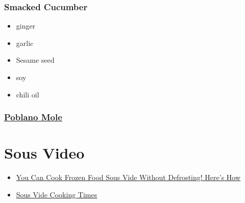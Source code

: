 \documentclass[
]{article}
\providecommand{\tightlist}{%
  \setlength{\itemsep}{0pt}\setlength{\parskip}{0pt}}
\begin{document}
\hypertarget{smacked-cucumber}{%
\section{Smacked Cucumber}\label{smacked-cucumber}}

\begin{itemize}
\tightlist
\item
  ginger
\item
  garlic
\item
  Sesame seed
\item
  soy
\item
  chili oil
\end{itemize}

\hypertarget{poblano-mole}{%
\section{\texorpdfstring{\href{https://www.seriouseats.com/recipes/2012/10/mole-poblano-recipe-how-to-make-mole.html}{Poblano Mole}}{Poblano Mole}}\label{poblano-mole}}

\hypertarget{part-sous-video}{%
\part{Sous Video}\label{part-sous-video}}

\begin{itemize}
\tightlist
\item
  \href{https://www.chefsteps.com/activities/you-can-cook-frozen-food-sous-vide-without-defrosting-here-s-how}{You Can Cook Frozen Food Sous Vide Without Defrosting! Here's How}
\item
  \href{https://www.chefsteps.com/activities/sous-vide-time-and-temperature-guide}{Sous Vide Cooking Times}
\end{itemize}

  

\printindex
\end{document}
